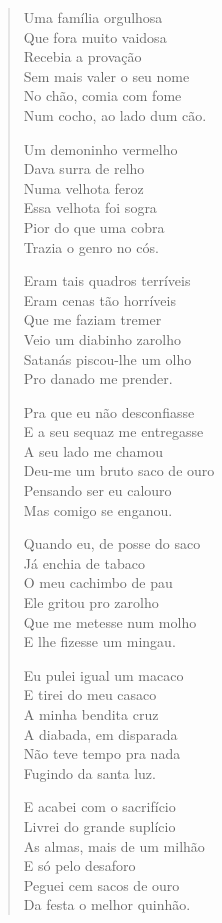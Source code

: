 \begin{verse}
Uma família orgulhosa\\
Que fora muito vaidosa\\
Recebia a provação\\
Sem mais valer o seu nome\\
No chão, comia com fome\\
Num cocho, ao lado dum cão. 

Um demoninho vermelho\\
Dava surra de relho \\
Numa velhota feroz\\
Essa velhota foi sogra\\
Pior do que uma cobra\\
Trazia o genro no cós.

Eram tais quadros terríveis\\
Eram cenas tão horríveis\\
Que me faziam tremer\\
Veio um diabinho zarolho\\
Satanás piscou-lhe um olho\\
Pro danado me prender.
\pagebreak

Pra que eu não desconfiasse\\
E a seu sequaz me entregasse\\
A seu lado me chamou\\
Deu-me um bruto saco de ouro\\
Pensando ser eu calouro\\
Mas comigo se enganou.

Quando eu, de posse do saco\\
Já enchia de tabaco\\
O meu cachimbo de pau\\
Ele gritou pro zarolho\\
Que me metesse num molho\\
E lhe fizesse um mingau.

Eu pulei igual um macaco\\
E tirei do meu casaco\\
A minha bendita cruz\\
A diabada, em disparada\\
Não teve tempo pra nada\\
Fugindo da santa luz.

E acabei com o sacrifício\\
Livrei do grande suplício\\
As almas, mais de um milhão\\
E só pelo desaforo\\
Peguei cem sacos de ouro\\
Da festa o melhor quinhão.
\pagebreak


\end{verse}

